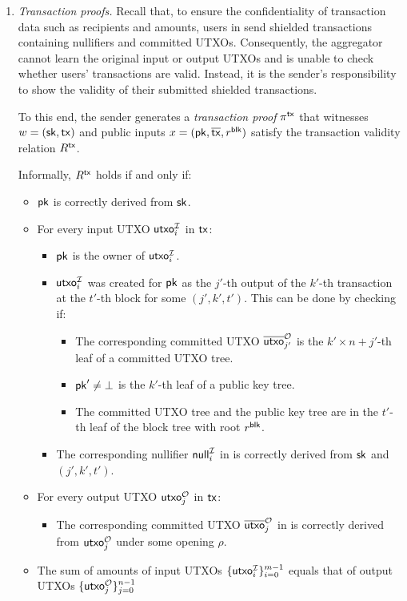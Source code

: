 \begin{enumerate}
    \item \textit{Transaction proofs.}
    Recall that, to ensure the confidentiality of transaction data such as recipients and amounts, users in \Protocol send shielded transactions containing nullifiers and committed \acp{UTXO}.
    Consequently, the aggregator cannot learn the original input or output \acp{UTXO} and is unable to check whether users' transactions are valid.
    Instead, it is the sender's responsibility to show the validity of their submitted shielded transactions.
    
    To this end, the sender generates a \textit{transaction proof} $\pi^\mathsf{tx}$ that witnesses $w = ({\mathsf{sk}}, \mathsf{tx})$ and public inputs $x = ({\mathsf{pk}}, \overline{\mathsf{tx}}, r^\mathsf{blk})$ satisfy the transaction validity relation $R^\mathsf{tx}$.

    Informally, $R^\mathsf{tx}$ holds if and only if:
    \begin{itemize}
        \item ${\mathsf{pk}}$ is correctly derived from ${\mathsf{sk}}$.
        \item For every input \ac{UTXO} $\mathsf{utxo}^\mathcal{I}_i$ in $\mathsf{tx}$:
        \begin{itemize}
            \item ${\mathsf{pk}}$ is the owner of $\mathsf{utxo}^\mathcal{I}_i$.
            \item $\mathsf{utxo}^\mathcal{I}_i$ was created for ${\mathsf{pk}}$ as the $j'$-th output of the $k'$-th transaction at the $t'$-th block for some $(j', k', t')$.
            This can be done by checking if:
            \begin{itemize}
                \item The corresponding committed \ac{UTXO} $\overline{\mathsf{utxo}}^\mathcal{O}_{j'}$ is the $k' \times n + j'$-th leaf of a committed \ac{UTXO} tree.
                \item ${\mathsf{pk}}' \neq \bot$ is the $k'$-th leaf of a public key tree.
                \item The committed \ac{UTXO} tree and the public key tree are in the $t'$-th leaf of the block tree with root $r^\mathsf{blk}$.
            \end{itemize}
            \item The corresponding nullifier $\mathsf{null}^\mathcal{I}_i$ in \TxShielded is correctly derived from ${\mathsf{sk}}$ and $(j', k', t')$.
        \end{itemize}
        \item For every output \ac{UTXO} $\mathsf{utxo}^\mathcal{O}_j$ in $\mathsf{tx}$:
        \begin{itemize}
            \item The corresponding committed \ac{UTXO} $\overline{\mathsf{utxo}}^\mathcal{O}_j$ in \TxShielded is correctly derived from $\mathsf{utxo}^\mathcal{O}_j$ under some opening $\rho$.
        \end{itemize}
        \item The sum of amounts of input \acp{UTXO} $\{\mathsf{utxo}^\mathcal{I}_i\}^{m - 1}_{i = 0}$ equals that of output \acp{UTXO} $\{\mathsf{utxo}^\mathcal{O}_j\}^{n - 1}_{j = 0}$
    \end{itemize}
    

\end{enumerate}
